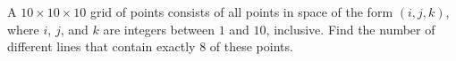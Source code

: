 A $10\times 10\times 10$ grid of points consists of all points in space of the form $(i,j,k)$,  where $i$,  $j$,  and $k$ are integers between $1$ and $10$,  inclusive. Find the number of different lines that contain exactly $8$ of these points.